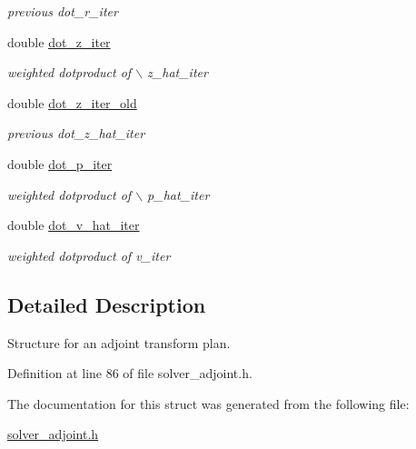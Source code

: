 \begin{CompactItemize}
\begin{CompactList}\small\item\em previous dot\_\-r\_\-iter \item\end{CompactList}\item 
\hypertarget{structinfct__adjoint__plan_b848ecc31c17b9cd639e9834ee56816d}{
double \hyperlink{structinfct__adjoint__plan_b848ecc31c17b9cd639e9834ee56816d}{dot\_\-z\_\-iter}}
\label{structinfct__adjoint__plan_b848ecc31c17b9cd639e9834ee56816d}

\begin{CompactList}\small\item\em weighted dotproduct of $\backslash$ z\_\-hat\_\-iter \item\end{CompactList}\item 
\hypertarget{structinfct__adjoint__plan_d2417d37a566a0d26dea57f6f875ca12}{
double \hyperlink{structinfct__adjoint__plan_d2417d37a566a0d26dea57f6f875ca12}{dot\_\-z\_\-iter\_\-old}}
\label{structinfct__adjoint__plan_d2417d37a566a0d26dea57f6f875ca12}

\begin{CompactList}\small\item\em previous dot\_\-z\_\-hat\_\-iter \item\end{CompactList}\item 
\hypertarget{structinfct__adjoint__plan_50526d4b81b2dd8cf90e82ad162af3c5}{
double \hyperlink{structinfct__adjoint__plan_50526d4b81b2dd8cf90e82ad162af3c5}{dot\_\-p\_\-iter}}
\label{structinfct__adjoint__plan_50526d4b81b2dd8cf90e82ad162af3c5}

\begin{CompactList}\small\item\em weighted dotproduct of $\backslash$ p\_\-hat\_\-iter \item\end{CompactList}\item 
\hypertarget{structinfct__adjoint__plan_c1b772ccfa72ce8e522298aeef3b1e1b}{
double \hyperlink{structinfct__adjoint__plan_c1b772ccfa72ce8e522298aeef3b1e1b}{dot\_\-v\_\-hat\_\-iter}}
\label{structinfct__adjoint__plan_c1b772ccfa72ce8e522298aeef3b1e1b}

\begin{CompactList}\small\item\em weighted dotproduct of v\_\-iter \item\end{CompactList}\end{CompactItemize}


\subsection{Detailed Description}
Structure for an adjoint transform plan. 

Definition at line 86 of file solver\_\-adjoint.h.

The documentation for this struct was generated from the following file:\begin{CompactItemize}
\item 
\hyperlink{solver__adjoint_8h}{solver\_\-adjoint.h}\end{CompactItemize}

